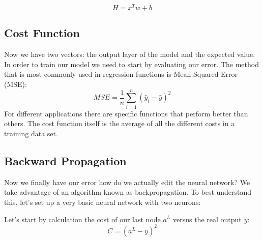 \documentclass[12pt]{article}
\begin{document}
\vspace{-1ex}

\vspace{-1ex}
\vspace{-1ex}
\vspace{-1ex}
\vspace{-1ex}
$$
H = x^Tw + b
$$
\vspace{-3ex}
\vspace{-3ex}
\vspace{-3ex}
\vspace{-3ex}
\subsection*{Cost Function}
\vspace{-3ex}
Now we have two vectors: the output layer of the model and the expected value. In order to train our model we need to start by evaluating our error. The method that is most commonly used in regression functions is Mean-Squared Error (MSE):
$$
MSE=\frac{1}{n}\sum_{i=1}^{n}(\hat{y}_i-\hat{y})^2
$$
\vspace{0ex}
For different applications there are specific functions that perform better than others. The cost function itself is the average of all the different costs in a training data set. 

\subsection*{Backward Propagation}
Now we finally have our error how do we actually edit the neural network? We take advantage of an algorithm known as backpropagation. To best understand this, let's set up a very basic neural network with two neurons:

 \begin{center}
	
\end{center}
 
 Let's start by calculation the cost of our last node $a^L$ versus the real output $y$:
 $$
 C = (a^L-y)^2
 $$
 
\end{document}
